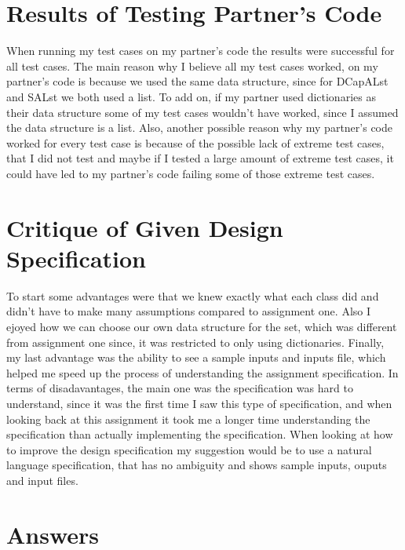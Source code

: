 \documentclass[12pt]{article}
\begin{document}
\section{Results of Testing Partner's Code}

When running my test cases on my partner's code the results were successful for all test cases. The main reason why I believe all my test cases worked, on my partner's code is because we used the same data structure, since for DCapALst and SALst we both used a list. To add on, if my partner used dictionaries as their data structure some of my test cases wouldn't have worked, since I assumed the data structure is a list. Also, another possible reason why my partner's code worked for every test case is because of the possible lack of extreme test cases, that I did not test and maybe if I tested a large amount of extreme test cases, it could have led to my partner's code failing some of those extreme test cases.

\section{Critique of Given Design Specification}

 To start some advantages were that we knew exactly what each class did and didn't have to make many assumptions compared to assignment one. Also I ejoyed how we can choose our own data structure for the set, which was different from assignment one since, it was restricted to only using dictionaries. Finally, my last advantage was the ability to see a sample inputs and inputs file, which helped me speed up the process of understanding the assignment specification. In terms of disadavantages, the main one was the specification was hard to understand, since it was the first time I saw this type of specification, and when looking back at this assignment it took me a longer time understanding the specification than actually implementing the specification. When looking at how to improve the design specification my suggestion would be to use a natural language specification, that has no ambiguity and shows sample inputs, ouputs and input files.

\section{Answers}
\end{document}
